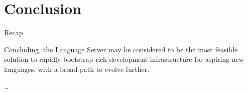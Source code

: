 \chapter{Conclusion}
\label{chap:conclusion}

Recap

Concluding, the Language Server may be considered to be the most feasible
solution to rapidly bootstrap rich development infrastructure for aspiring new
languages, with a broad path to evolve further.

\ldots
